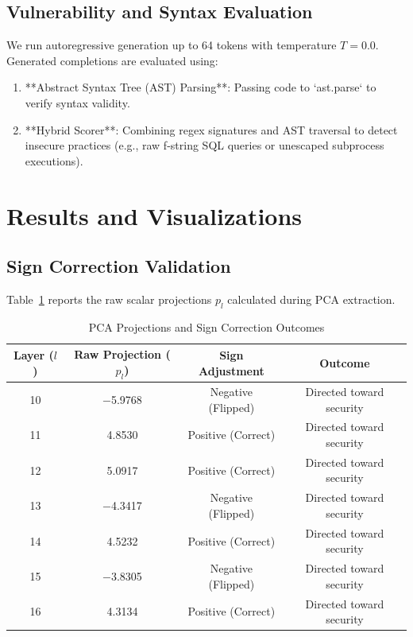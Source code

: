 \documentclass[journal, onecolumn]{IEEEtran}
\begin{document}
\subsection{Vulnerability and Syntax Evaluation}
We run autoregressive generation up to 64 tokens with temperature $T=0.0$. Generated completions are evaluated using:
\begin{enumerate}
    \item **Abstract Syntax Tree (AST) Parsing**: Passing code to `ast.parse` to verify syntax validity.
    \item **Hybrid Scorer**: Combining regex signatures and AST traversal to detect insecure practices (e.g., raw f-string SQL queries or unescaped subprocess executions).
\end{enumerate}

\section{Results and Visualizations}
\label{sec:results}

\subsection{Sign Correction Validation}
Table~\ref{tab:sign_projections} reports the raw scalar projections $p_l$ calculated during PCA extraction. 

\begin{table}[h]
\centering
\caption{PCA Projections and Sign Correction Outcomes}
\label{tab:sign_projections}
\begin{tabular}{@{}cccc@{}}
\toprule
\textbf{Layer ($l$)} & \textbf{Raw Projection ($p_l$)} & \textbf{Sign Adjustment} & \textbf{Outcome} \\ \midrule
10 & $-$5.9768 & Negative (Flipped) & Directed toward security \\
11 & \phantom{$-$}4.8530 & Positive (Correct) & Directed toward security \\
12 & \phantom{$-$}5.0917 & Positive (Correct) & Directed toward security \\
13 & $-$4.3417 & Negative (Flipped) & Directed toward security \\
14 & \phantom{$-$}4.5232 & Positive (Correct) & Directed toward security \\
15 & $-$3.8305 & Negative (Flipped) & Directed toward security \\
16 & \phantom{$-$}4.3134 & Positive (Correct) & Directed toward security \\ \bottomrule
\end{tabular}
\end{table}
\end{document}
